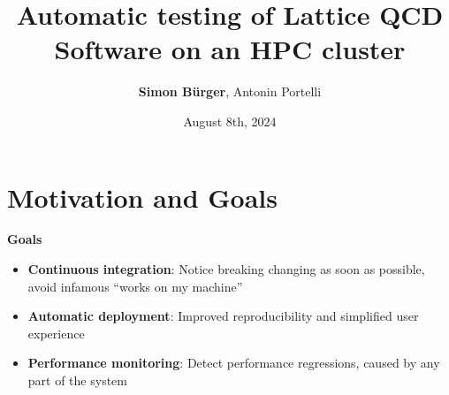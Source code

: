 \documentclass[english,xcolor=pst,11pt]{beamer}
\title[Automatic software testing on an HPC cluster]{Automatic testing of Lattice QCD Software on an HPC cluster}
\author{\textbf{Simon Bürger}, Antonin Portelli}
\date{August 8th, 2024}
\begin{document}
\maketitle

%



\section{Motivation and Goals}

\begin{frame}

\textbf{Goals}
\begin{itemize}
 \item \textbf{Continuous integration}: Notice breaking changing as soon as possible, avoid infamous ``works on my machine''
 \item \textbf{Automatic deployment}: Improved reproducibility and simplified user experience
 \item \textbf{Performance monitoring}: Detect performance regressions, caused by any part of the system
\end{itemize}

\end{frame}
\end{document}
